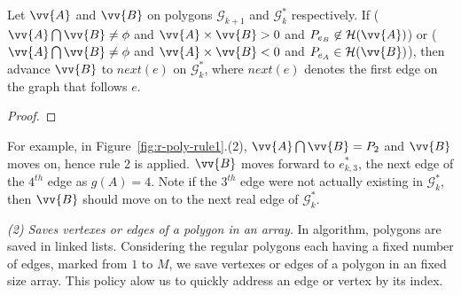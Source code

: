 \begin{theorem}
\label{prop-rule2}
Let $\vv{A}$ and $\vv{B}$ on polygons $\mathcal{G}_{k+1}$ and $\mathcal{G}^*_k$ respectively.
If ($\vv{A} \bigcap \vv{B} \ne \phi$ and $\vv{A} \times \vv{B} > 0$ and $P_{e_B} \not \in \mathcal{H}(\vv{A})$) or ($\vv{A} \bigcap \vv{B} \ne \phi$ and $\vv{A} \times \vv{B} < 0$ and $P_{e_A} \in \mathcal{H}(\vv{B})$), then advance $\vv{B}$ to $next(e)$ on $\mathcal{G}^*_k$, where $next(e)$ denotes the first edge on the graph that follows $e$.
\end{theorem}

\begin{proof}

\end{proof}

For example, in Figure~\ref{fig:r-poly-rule1}.(2), $\vv{A} \bigcap \vv{B} = P_2$ and $\vv{B}$ moves on, hence rule 2 is applied. $\vv{B}$ moves forward to $e^*_{k, 3}$, \ie the next edge of the $4^{th}$ edge as $g(A) = 4$.
Note if the $3^{th}$ edge were not actually existing in $\mathcal{G}^*_k$, then $\vv{B}$ should move on to the next real edge of $\mathcal{G}^*_k$.




\vspace{1ex}
\ni \emph{{(2) Saves vertexes or edges of a polygon in an array}}.
In \cpia algorithm, polygons are saved in linked lists.
Considering the regular polygons each having a fixed number of edges, marked from $1$ to $M$, we save vertexes or edges of a polygon in an fixed size array. This policy alow us to quickly address an edge or vertex by its index.

